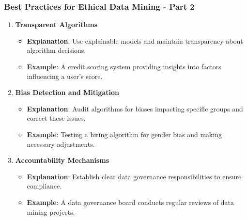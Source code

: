 \documentclass{beamer}
\begin{document}
\begin{frame}[fragile]
    \frametitle{Best Practices for Ethical Data Mining - Part 2}
    \begin{enumerate}[resume]
        \item \textbf{Transparent Algorithms}
        \begin{itemize}
            \item \textbf{Explanation}: Use explainable models and maintain transparency about algorithm decisions.
            \item \textbf{Example}: A credit scoring system providing insights into factors influencing a user’s score.
        \end{itemize}

        \item \textbf{Bias Detection and Mitigation}
        \begin{itemize}
            \item \textbf{Explanation}: Audit algorithms for biases impacting specific groups and correct these issues.
            \item \textbf{Example}: Testing a hiring algorithm for gender bias and making necessary adjustments.
        \end{itemize}

        \item \textbf{Accountability Mechanisms}
        \begin{itemize}
            \item \textbf{Explanation}: Establish clear data governance responsibilities to ensure compliance.
            \item \textbf{Example}: A data governance board conducts regular reviews of data mining projects.
        \end{itemize}
    \end{enumerate}
\end{frame}
\end{document}
